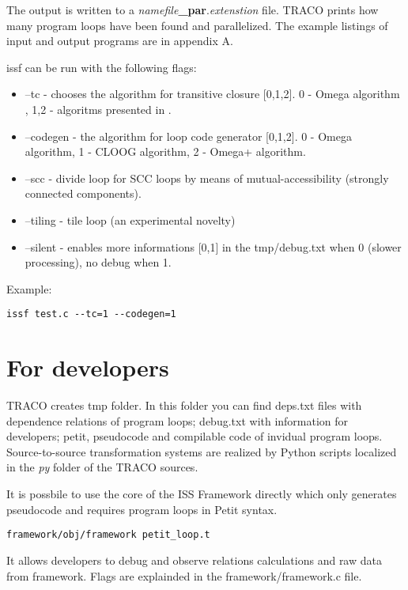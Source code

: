 \documentclass[a4paper,12pt]{book}
\begin{document}
The output is written to a \textit{namefile}\textbf{\_par}.\textit{extenstion} file. TRACO prints how many program loops have been  found and parallelized. The example listings of input and output programs are in appendix A.

issf can be run with the following flags:

\begin{itemize}
\item --tc - chooses the algorithm for transitive closure [0,1,2]. 0 - Omega algorithm \cite{kelly}, 1,2 - algoritms presented in \cite{cocoa}. 
\item --codegen - the algorithm for loop code generator [0,1,2]. 0 - Omega algorithm, 1 - CLOOG algorithm, 2 - Omega+ algorithm.
\item --scc - divide loop for SCC loops by means of mutual-accessibility (strongly connected components).
\item --tiling - tile loop (an experimental novelty)
\item --silent - enables more informations [0,1] in the tmp/debug.txt when 0 (slower processing), no debug when 1. 
\end{itemize}

Example:

\begin{verbatim}
issf test.c --tc=1 --codegen=1
\end{verbatim}

\section{For developers}

TRACO creates tmp folder. In this folder you can find deps.txt files with dependence relations of program loops; debug.txt with information for developers; petit, pseudocode and compilable code of invidual program loops. Source-to-source transformation systems are realized by Python scripts localized in the \textit{py} folder of the TRACO sources.

It is possbile to use the core of the ISS Framework directly which only generates pseudocode and requires program loops in Petit syntax. 

\begin{verbatim}
framework/obj/framework petit_loop.t 
\end{verbatim}

It allows developers to debug and observe relations calculations and raw data from framework. Flags are explainded in the framework/framework.c file.
\end{document}
